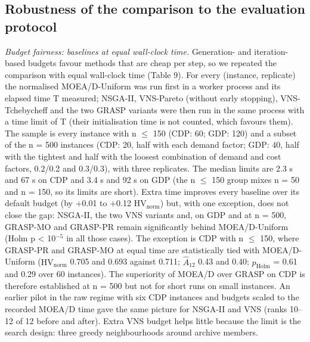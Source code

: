 \subsection{Robustness of the comparison to the evaluation protocol}\label{sec:robustness_of_the_comparison}

\emph{Budget fairness: baselines at equal wall-clock time.} Generation- and iteration-based budgets favour methods that are cheap per step, so we repeated the comparison with equal wall-clock time (Table 9). For every (instance, replicate) the normalised MOEA/D-Uniform was run first in a worker process and its elapsed time T measured; NSGA-II, VNS-Pareto (without early stopping), VNS-Tchebycheff and the two GRASP variants were then run in the same process with a time limit of T (their initialisation time is not counted, which favours them). The sample is every instance with n $\leq$ 150 (CDP: 60; GDP: 120) and a subset of the n = 500 instances (CDP: 20, half with each demand factor; GDP: 40, half with the tightest and half with the loosest combination of demand and cost factors, 0.2/0.2 and 0.3/0.3), with three replicates. The median limits are 2.3 s and 67 s on CDP and 3.4 s and 92 s on GDP (the n $\leq$ 150 group mixes n = 50 and n = 150, so its limits are short). Extra time improves every baseline over its default budget (by +0.01 to +0.12 $\mathrm{HV}_{\mathrm{norm}}$) but, with one exception, does not close the gap: NSGA-II, the two VNS variants and, on GDP and at n = 500, GRASP-MO and GRASP-PR remain significantly behind MOEA/D-Uniform (Holm p < 10$^{-5}$ in all those cases). The exception is CDP with n $\leq$ 150, where GRASP-PR and GRASP-MO at equal time are statistically tied with MOEA/D-Uniform ($\mathrm{HV}_{\mathrm{norm}}$ 0.705 and 0.693 against 0.711; $\hat{A}_{12}$ 0.43 and 0.40; $p_{\mathrm{Holm}}$ = 0.61 and 0.29 over 60 instances). The superiority of MOEA/D over GRASP on CDP is therefore established at n = 500 but not for short runs on small instances. An earlier pilot in the raw regime with six CDP instances and budgets scaled to the recorded MOEA/D time gave the same picture for NSGA-II and VNS (ranks 10--12 of 12 before and after). Extra VNS budget helps little because the limit is the search design: three greedy neighbourhoods around archive members.

